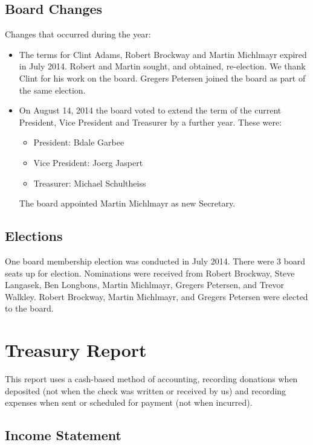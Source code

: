 \documentclass[letterpaper]{report}
\begin{document}
\section{Board Changes}

Changes that occurred during the year:

\begin{itemize}
\item The terms for Clint Adams, Robert Brockway and Martin Michlmayr
expired in July 2014.  Robert and Martin sought, and obtained,
re-election.  We thank Clint for his work on the board.  Gregers
Petersen joined the board as part of the same election.
\item On August 14, 2014 the board voted to extend the term of the
current President, Vice President and Treasurer by a further year.
These were:
\begin{itemize}
\item President: Bdale Garbee
\item Vice President: Joerg Jaspert
\item Treasurer: Michael Schultheiss
\end{itemize}
The board appointed Martin Michlmayr as new Secretary.
\end{itemize}

\section{Elections}

One board membership election was conducted in July 2014.  There were 3
board seats up for election.  Nominations were received from Robert
Brockway, Steve Langasek, Ben Longbons, Martin Michlmayr, Gregers
Petersen, and Trevor Walkley.  Robert Brockway, Martin Michlmayr, and
Gregers Petersen were elected to the board.

\chapter{Treasury Report}

This report uses a cash-based method of accounting, recording donations when
deposited (not when the check was written or received by us) and recording
expenses when sent or scheduled for payment (not when incurred).

\section{Income Statement}
\end{document}
